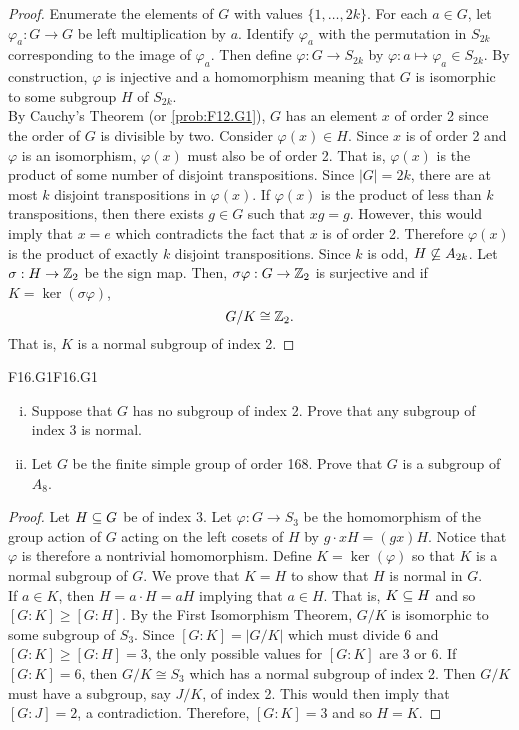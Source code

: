 \documentclass[../AlgebraQualSolutions.tex]{subfiles}
\begin{document}
\begin{proof}
    Enumerate the elements of $G$ with values $\{1,\ldots, 2k\}$. For each $a \in G$, let $\varphi_a: G \to G$ be left multiplication by $a$. Identify $\varphi_a$ with the permutation in $S_{2k}$ corresponding to the image of $\varphi_a$. Then define $\varphi: G \to S_{2k}$ by $\varphi: a \mapsto \varphi_{a} \in S_{2k}$. By construction, $\varphi$ is injective and a homomorphism meaning that $G$ is isomorphic to some subgroup $H$ of $S_{2k}$.\\

    By Cauchy's Theorem (or \ref{prob:F12.G1}), $G$ has an element $x$ of order 2 since the order of $G$ is divisible by two. Consider $\varphi(x) \in H$. Since $x$ is of order 2 and $\varphi$ is an isomorphism, $\varphi(x)$ must also be of order 2. That is, $\varphi(x)$ is the product of some number of disjoint transpositions. Since $|G| = 2k$, there are at most $k$ disjoint transpositions in $\varphi(x)$. If $\varphi(x)$ is the product of less than $k$ transpositions, then there exists $g \in G$ such that $xg = g$. However, this would imply that $x = e$ which contradicts the fact that $x$ is of order 2. Therefore $\varphi(x)$ is the product of exactly $k$ disjoint transpositions. Since $k$ is odd, $H \not\subseteq A_{2k}$. Let $\sigma: H \to \mathbb{Z}_2$ be the sign map. Then, $\sigma\varphi: G \to \mathbb{Z}_2$ is surjective and if $K = \ker(\sigma\varphi)$,
        \[G/K \cong \mathbb{Z}_2.\]
    That is, $K$ is a normal subgroup of index 2.
\end{proof}

\begin{prob}{F16.G1}{F16.G1}
    \begin{enumerate}[(i)]
        \item Suppose that $G$ has no subgroup of index 2. Prove that any subgroup of index 3 is normal.
        \item Let $G$ be the finite simple group of order 168. Prove that $G$ is a subgroup of $A_8$.
    \end{enumerate}
\end{prob}

\begin{proof}
    Let $H \subseteq G$ be of index 3. Let $\varphi: G \to S_3$ be the homomorphism of the group action of $G$ acting on the left cosets of $H$ by $g\cdot xH = (gx)H$. Notice that $\varphi$ is therefore a nontrivial homomorphism. Define $K = \ker(\varphi)$ so that $K$ is a normal subgroup of $G$. We prove that $K = H$ to show that $H$ is normal in $G$.\\

    If $a \in K$, then $H = a\cdot H = aH$ implying that $a \in H$. That is, $K \subseteq H$ and so $[G:K] \geq [G:H]$. By the First Isomorphism Theorem, $G/K$ is isomorphic to some subgroup of $S_3$. Since $[G:K] = |G/K|$ which must divide 6 and $[G:K] \geq [G:H] = 3$, the only possible values for $[G:K]$ are 3 or 6. If $[G:K] =6$, then $G/K \cong S_3$ which has a normal subgroup of index 2. Then $G/K$ must have a subgroup, say $J/K$, of index 2. This would then imply that $[G:J] =2$, a contradiction. Therefore, $[G:K] = 3$ and so $H = K$.
\end{proof}
\end{document}
